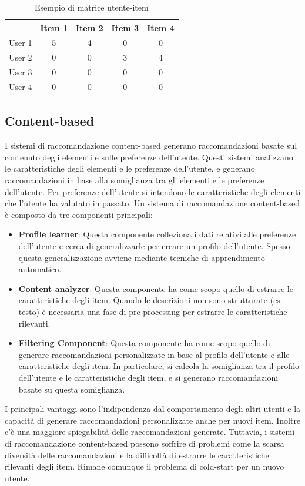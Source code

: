 \begin{table}[H]
    \centering
    \begin{tabular}{|c|c|c|c|c|}
        \hline
        & Item 1 & Item 2 & Item 3 & Item 4 \\
        \hline
        User 1 & 5 & 4 & 0 & 0 \\ \hline
        User 2 & 0 & 0 & 3 & 4 \\ \hline
        User 3 & 0 & 0 & 0 & 0 \\ \hline
        User 4 & 0 & 0 & 0 & 0 \\
        \hline
    \end{tabular}
    \caption{Esempio di matrice utente-item}
\end{table}


\subsection{Content-based}
I sistemi di raccomandazione content-based generano raccomandazioni basate sul contenuto degli elementi e sulle preferenze dell'utente. Questi sistemi analizzano le caratteristiche degli elementi e le preferenze dell'utente, e generano raccomandazioni in base alla somiglianza tra gli elementi e le preferenze dell'utente. Per preferenze dell'utente si intendono le caratteristiche degli elementi che l'utente ha valutato in passato.
Un sistema di raccomandazione content-based è composto da tre componenti principali:
\begin{itemize}
    \item \textbf{Profile learner}: Questa componente colleziona i dati relativi alle preferenze dell'utente e cerca di generalizzarle per creare un profilo dell'utente. Spesso questa generalizzazione avviene mediante tecniche di apprendimento automatico.
    \item \textbf{Content analyzer}: Questa componente ha come scopo quello di estrarre le caratteristiche degli item. Quando le descrizioni non sono strutturate (es. testo) è necessaria una fase di pre-processing per estrarre le caratteristiche rilevanti.
    \item \textbf{Filtering Component}: Questa componente ha come scopo quello di generare raccomandazioni personalizzate in base al profilo dell'utente e alle caratteristiche degli item. In particolare, si calcola la somiglianza tra il profilo dell'utente e le caratteristiche degli item, e si generano raccomandazioni basate su questa somiglianza.
\end{itemize}
I principali vantaggi sono l'indipendenza dal comportamento degli altri utenti e la capacità di generare raccomandazioni personalizzate anche per nuovi item. Inoltre c'è una maggiore spiegabilità delle raccomandazioni generate. Tuttavia, i sistemi di raccomandazione content-based possono soffrire di problemi come la scarsa diversità delle raccomandazioni e la difficoltà di estrarre le caratteristiche rilevanti degli item. Rimane comunque il problema di cold-start per un nuovo utente.
